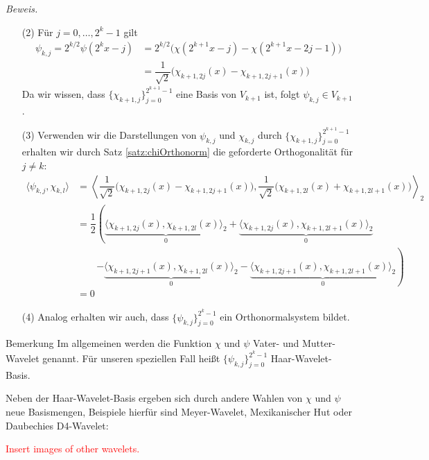 \textit{Beweis.} 
\begin{enumerate}
  \item[(2)] 
  Für $j=0,\dots,2^k-1$ gilt 
  \begin{align*}
    \psi_{k,j} 
    = 2^{k/2}\psi(2^kx-j) 
    &= 2^{k/2}\Big(\chi(2^{k+1}x-j)-\chi(2^{k+1}x-2j-1)\Big) \\
    &= \dfrac{1}{\sqrt{2}}\Big(\chi_{k+1,2j}(x) - \chi_{k+1,2j+1}(x)\Big)
  \end{align*}
  Da wir wissen, dass $\{\chi_{k+1,j}\}_{j=0}^{2^{k+1}-1}$ eine Basis von $V_{k+1}$ ist, folgt $\psi_{k,j}\in V_{k+1}$.
  \item[(3)] Verwenden wir die Darstellungen von $\psi_{k,j}$ und $\chi_{k,j}$ durch $\{\chi_{k+1,j}\}_{j=0}^{2^{k+1}-1}$
  erhalten wir durch Satz \ref{satz:chiOrthonorm} die geforderte Orthogonalität für $j\neq k$:
  \begin{align*}
    \langle \psi_{k,j}, \chi_{k,l} \rangle
    &= \left\langle \dfrac{1}{\sqrt{2}}\Big(\chi_{k+1,2j}(x) - \chi_{k+1,2j+1}(x)\Big), 
    \dfrac{1}{\sqrt{2}}\Big(\chi_{k+1,2l}(x) + \chi_{k+1,2l+1}(x)\Big) \right\rangle _2 \\
    &= \dfrac{1}{2}\left(
      \underbrace{\langle \chi_{k+1,2j}(x), \chi_{k+1,2l}(x) \rangle_2}_{0}
      + \underbrace{\langle \chi_{k+1,2j}(x), \chi_{k+1,2l+1}(x) \rangle_2}_{0}\right.\\
      &\qquad \left.- \underbrace{\langle \chi_{k+1,2j+1}(x), \chi_{k+1,2l}(x) \rangle_2}_{0}
      - \underbrace{\langle \chi_{k+1,2j+1}(x), \chi_{k+1,2l+1}(x) \rangle_2}_{0} 
    \right)\\
    &= 0
  \end{align*}
  \item[(4)] Analog erhalten wir auch, dass $\{\psi_{k,j}\}_{j=0}^{2^k-1}$ ein Orthonormalsystem bildet.
\end{enumerate}

\begin{colbox}{Bemerkung}
  Im allgemeinen werden die Funktion $\chi$ und $\psi$ Vater- und Mutter-Wavelet genannt. Für unseren speziellen Fall 
  heißt $\{\psi_{k,j}\}_{j=0}^{2^k-1}$ Haar-Wavelet-Basis. 

  Neben der Haar-Wavelet-Basis ergeben sich durch andere Wahlen von $\chi$ und $\psi$ neue Basismengen, Beispiele 
  hierfür sind Meyer-Wavelet, Mexikanischer Hut oder Daubechies D4-Wavelet:

  \textcolor{red}{Insert images of other wavelets.}
\end{colbox}

